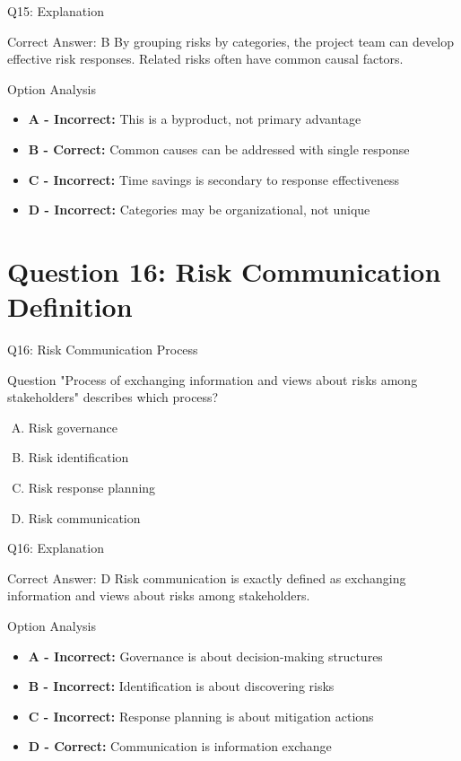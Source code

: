 \documentclass{beamer}
\begin{document}
	\begin{frame}{Q15: Explanation}
		\begin{block}{Correct Answer: B}
			By grouping risks by categories, the project team can develop effective risk responses. Related risks often have common causal factors.
		\end{block}
		\begin{block}{Option Analysis}
			\begin{itemize}
				\item \textbf{A - Incorrect:} This is a byproduct, not primary advantage
				\item \textbf{B - Correct:} Common causes can be addressed with single response
				\item \textbf{C - Incorrect:} Time savings is secondary to response effectiveness
				\item \textbf{D - Incorrect:} Categories may be organizational, not unique
			\end{itemize}
		\end{block}
	\end{frame}
	
	\section{Question 16: Risk Communication Definition}
	
	\begin{frame}{Q16: Risk Communication Process}
		\begin{block}{Question}
			"Process of exchanging information and views about risks among stakeholders" describes which process?
		\end{block}
		\begin{enumerate}[(A)]
			\item Risk governance
			\item Risk identification
			\item Risk response planning
			\item Risk communication
		\end{enumerate}
	\end{frame}
	
	\begin{frame}{Q16: Explanation}
		\begin{block}{Correct Answer: D}
			Risk communication is exactly defined as exchanging information and views about risks among stakeholders.
		\end{block}
		\begin{block}{Option Analysis}
			\begin{itemize}
				\item \textbf{A - Incorrect:} Governance is about decision-making structures
				\item \textbf{B - Incorrect:} Identification is about discovering risks
				\item \textbf{C - Incorrect:} Response planning is about mitigation actions
				\item \textbf{D - Correct:} Communication is information exchange
			\end{itemize}
		\end{block}
	\end{frame}
	
\end{document}
